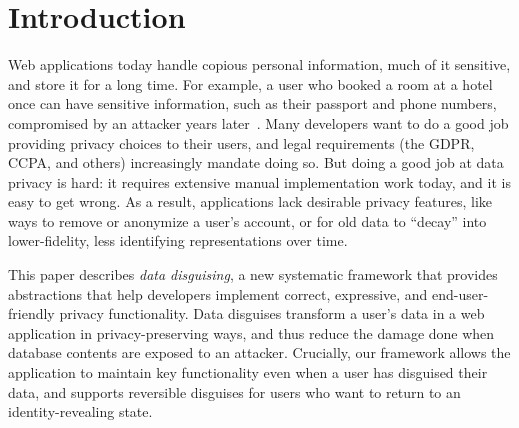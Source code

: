 \section{Introduction}
\label{s:intro}

%
Web applications today handle copious personal information, much of it
sensitive, and store it for a long time.
%
For example, a user who booked a room at a hotel once can have sensitive
information, such as their passport and phone numbers, compromised by
an attacker years later~\cite{starwood-hack}.
%
%
Many developers want to do a good job providing privacy choices to their users,
and legal requirements (\eg the GDPR, CCPA, and others) increasingly mandate
doing so.
%
%
But doing a good job at data privacy is hard: it requires extensive manual
implementation work today, and it is easy to get wrong.
%
As a result, applications lack desirable privacy features, like \eg ways to
remove or anonymize a user's account, or for old data to ``decay'' into
lower-fidelity, less identifying representations over time.
%

%
%

%
This paper describes \emph{data disguising}, a new systematic framework that
provides abstractions that help developers implement correct,
expressive, and end-user-friendly privacy functionality.
%
Data disguises transform a user's data in a web application in
privacy-preserving ways, and thus reduce the damage done when database contents
are exposed to an attacker.
%
Crucially, our framework allows the application to maintain key functionality even
when a user has disguised their data, and supports reversible disguises for users
who want to return to an identity-revealing state.
%

